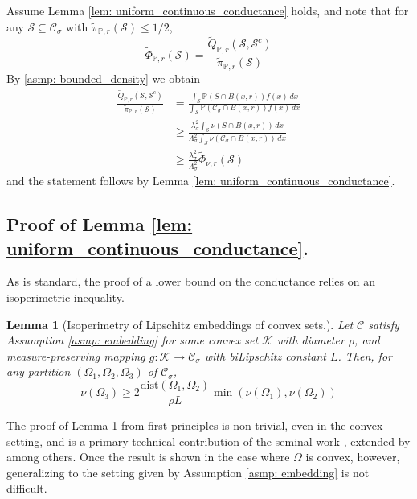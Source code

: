 \documentclass[11pt,twoside]{article}
\newtheorem{lemma}{Lemma}
\newcommand{\1}{\mathbf{1}}
\newcommand{\dist}{\mathrm{dist}}
\newcommand{\Pbb}{\mathbb{P}}
\newcommand{\Sset}{\mathcal{S}}
\newcommand{\Cset}{\mathcal{C}}
\newcommand{\Csig}{\Cset_{\sigma}}
\newcommand{\dx}{\,dx}
\newcommand{\piwt}{\widetilde{\pi}}
\begin{document}
Assume Lemma \ref{lem: uniform_continuous_conductance} holds, and note that for any $\Sset \subseteq \Csig$ with $\piwt_{\Pbb,r}(\Sset) \leq 1/2$,
\begin{equation*}
\widetilde{\Phi}_{\Pbb,r}(\Sset) = \frac{\widetilde{Q}_{\Pbb,r}(\Sset,\Sset^c)}{\piwt_{\Pbb,r}(\Sset)}
\end{equation*}
By \ref{asmp: bounded_density} we obtain
\begin{align*}
\frac{\widetilde{Q}_{\Pbb,r}(\Sset,\Sset^c)}{\piwt_{\Pbb,r}(\Sset)} & = \frac{\int_{\Sset} \Pbb(S \cap B(x,r)) f(x) \dx}{\int_{\Sset} \Pbb(\Csig \cap B(x,r)) f(x) \dx} \\
& \geq \frac{\lambda_{\sigma}^2 \int_{\Sset} \nu(S \cap B(x,r)) \dx}{\Lambda_{\sigma}^2 \int_{\Sset} \nu(\Csig \cap B(x,r)) \dx} \\
& \geq \frac{\lambda_{\sigma}^2}{\Lambda_{\sigma}^2} \widetilde{\Phi}_{\nu,r}(\Sset)
\end{align*}
and the statement follows by Lemma \ref{lem: uniform_continuous_conductance}.

\subsection{Proof of Lemma \ref{lem: uniform_continuous_conductance}.}
\label{sec: proof_of_lemma_continuous_conductance}

As is standard, the proof of a lower bound on the conductance relies on an isoperimetric inequality.

\begin{lemma}[Isoperimetry of Lipschitz embeddings of convex sets.]
	\label{lem: nonconvex_isoperimetry}
	Let $\Cset$ satisfy Assumption \ref{asmp: embedding} for some convex set $\mathcal{K}$ with diameter $\rho$, and measure-preserving mapping $g: \mathcal{K} \to \Csig$ with biLipschitz constant $L$. Then, for any partition $(\Omega_1,\Omega_2,\Omega_3)$ of $\Csig$, 
	\begin{equation*}
	\nu(\Omega_3) \geq 2\frac{\dist(\Omega_1, \Omega_2)}{\rho L} \min(\nu(\Omega_1), \nu(\Omega_2))
	\end{equation*}
\end{lemma}
The proof of Lemma \ref{lem: nonconvex_isoperimetry} from first principles is non-trivial, even in the convex setting, and is a primary technical contribution of the seminal work \cite{lovasz1990}, extended by \cite{dyer1991} among others. 
Once the result is shown in the case where $\Omega$ is convex, however, generalizing to the setting given by  Assumption \ref{asmp: embedding} is not difficult.
\end{document}

